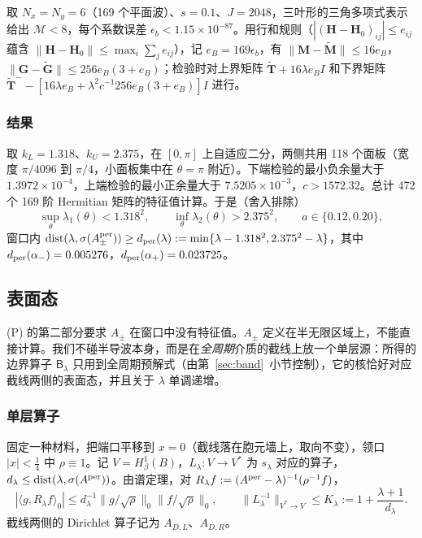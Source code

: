 \documentclass[11pt,a4paper,fontset=fandol]{ctexart}
\theoremstyle{plain}
\theoremstyle{definition}
\theoremstyle{remark}
\begin{document}
取 $N_x=N_y=6$（169 个平面波）、$s=0.1$、$J=2048$，三叶形的三角多项式表示给出 $\mathcal M<8$，每个系数误差 $\epsilon_b<1.15\times10^{-87}$。用行和规则（$|(\bm H-\bm H_0)_{ij}|\le e_{ij}$ 蕴含 $\|\bm H-\bm H_0\|\le\max_i\sum_je_{ij}$），记 $e_B=169\epsilon_b$，有 $\|\bm M-\tilde{\bm M}\|\le16e_B$，$\|\bm G-\tilde{\bm G}\|\le256e_B(3+e_B)$；检验时对上界矩阵 $\tilde{\bm T}+16\lambda e_BI$ 和下界矩阵 $\tilde{\bm T}^--[16\lambda e_B+\lambda^2c^{-1}256e_B(3+e_B)]I$ 进行。

\subsubsection{结果}

取 $k_L=1.318$、$k_U=2.375$，在 $[0,\pi]$ 上自适应二分，两侧共用 118 个面板（宽度 $\pi/4096$ 到 $\pi/4$，小面板集中在 $\theta=\pi$ 附近）。下端检验的最小负余量大于 $1.3972\times10^{-4}$，上端检验的最小正余量大于 $7.5205\times10^{-3}$，$c>1572.32$。总计 472 个 169 阶 Hermitian 矩阵的特征值计算。于是（舍入排除）
\[
\sup_\theta\lambda_1(\theta)<1.318^2,\qquad\inf_\theta\lambda_2(\theta)>2.375^2,\qquad a\in\{0.12,0.20\},
\]
窗口内 $\operatorname{dist}(\lambda,\sigma(A^{\rm per}_\pm))\ge d_{\rm per}(\lambda):=\min\{\lambda-1.318^2,2.375^2-\lambda\}$，其中 $d_{\rm per}(\alpha_-)=0.005276$，$d_{\rm per}(\alpha_+)=0.023725$。

\subsection{表面态}
\label{sec:surface}
(P) 的第二部分要求 $A_\pm$ 在窗口中没有特征值。$A_\pm$ 定义在半无限区域上，不能直接计算。我们不碰半导波本身，而是在\emph{全周期}介质的截线上放一个单层源：所得的边界算子 $\mathsf B_\lambda$ 只用到全周期预解式（由第~\ref{sec:band}~小节控制），它的核恰好对应截线两侧的表面态，并且关于 $\lambda$ 单调递增。

\subsubsection{单层算子}

固定一种材料，把端口平移到 $x=0$（截线落在胞元墙上，取向不变），领口 $|x|<\frac14$ 中 $\rho\equiv1$。记 $V=H^1_\beta(B)$，$L_\lambda:V\to V^*$ 为 $s_\lambda$ 对应的算子，$d_\lambda\le\operatorname{dist}(\lambda,\sigma(A^{\rm per}))$。由谱定理，对 $R_\lambda f:=(A^{\rm per}-\lambda)^{-1}(\rho^{-1}f)$，
\begin{equation}
\label{eq:per-resolvent}
|\langle g,R_\lambda f\rangle_0|\le d_\lambda^{-1}\|g/\sqrt\rho\|_0\|f/\sqrt\rho\|_0,\qquad\|L_\lambda^{-1}\|_{V^*\to V}\le K_\lambda:=1+\frac{\lambda+1}{d_\lambda}.
\end{equation}
截线两侧的 Dirichlet 算子记为 $A_{D,L}$、$A_{D,R}$。
\end{document}
